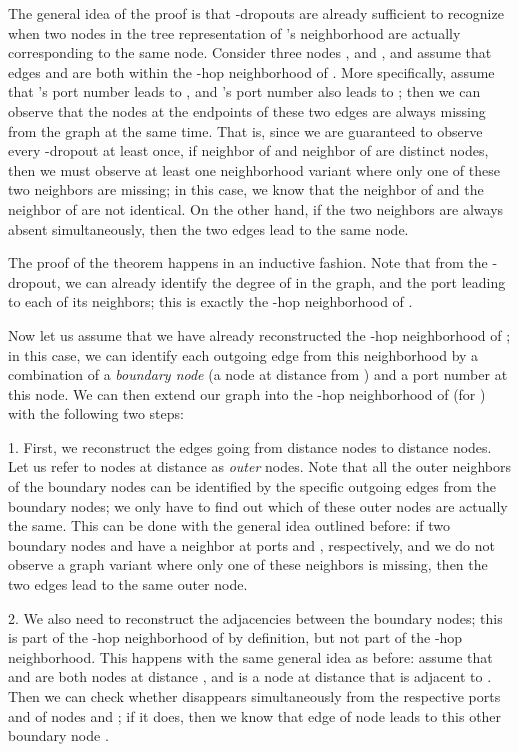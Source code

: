 \documentclass{article}
\begin{document}
The general idea of the proof is that -dropouts are already sufficient to recognize when two nodes in the tree representation of 's neighborhood are actually corresponding to the same node. Consider three nodes ,  and , and assume that edges  and  are both within the -hop neighborhood of . More specifically, assume that 's port number  leads to , and 's port number  also leads to ; then we can observe that the nodes at the endpoints of these two edges are always missing from the graph at the same time. That is, since we are guaranteed to observe every -dropout at least once, if neighbor  of  and neighbor  of  are distinct nodes, then we must observe at least one neighborhood variant where only one of these two neighbors are missing; in this case, we know that the  neighbor of  and the  neighbor of  are not identical. On the other hand, if the two neighbors are always absent simultaneously, then the two edges lead to the same node.

The proof of the theorem happens in an inductive fashion. Note that from the -dropout, we can already identify the degree of  in the graph, and the port leading to each of its neighbors; this is exactly the -hop neighborhood of .

Now let us assume that we have already reconstructed the -hop neighborhood of ; in this case, we can identify each outgoing edge from this neighborhood by a combination of a \textit{boundary node} (a node at distance  from ) and a port number at this node. We can then extend our graph into the -hop neighborhood of  (for ) with the following two steps:

 1. First, we reconstruct the edges going from distance  nodes to distance  nodes. Let us refer to nodes at distance  as \textit{outer} nodes. Note that all the outer neighbors of the boundary nodes can be identified by the specific outgoing edges from the boundary nodes; we only have to find out which of these outer nodes are actually the same. This can be done with the general idea outlined before: if two boundary nodes  and  have a neighbor at ports  and , respectively, and we do not observe a graph variant where only one of these neighbors is missing, then the two edges lead to the same outer node.

2. We also need to reconstruct the adjacencies between the boundary nodes; this is part of the -hop neighborhood of  by definition, but not part of the -hop neighborhood. This happens with the same general idea as before: assume that  and  are both nodes at distance , and  is a node at distance  that is adjacent to . Then we can check whether  disappears simultaneously from the respective ports  and  of nodes  and ; if it does, then we know that edge  of node  leads to this other boundary node .
\end{document}
